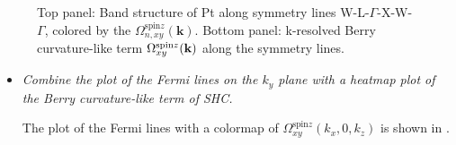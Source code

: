 \begin{figure}[htb!]
\centering
{}\qquad
{}
\caption{Top panel: Band structure of Pt along symmetry lines W-L-$\Gamma$-X-W-$\Gamma$, colored by
the $\Omega_{n,xy}^{\text{spin}z}({\bm k})$. 
Bottom panel: k-resolved Berry curvature-like term $\Omega_{xy}^{\text{spin}z}(\bf k)$ along the symmetry lines.}
\label{fig29.1}
\end{figure}
\clearpage

\begin{itemize}
	\item {\it Combine the plot of the Fermi lines on the $k_y$ plane with a heatmap plot of the Berry curvature-like term of SHC.}

	The plot of the Fermi lines with a colormap of $\Omega_{xy}^{\text{spin}z}(k_x,0,k_z)$ is shown in .
\end{itemize}

